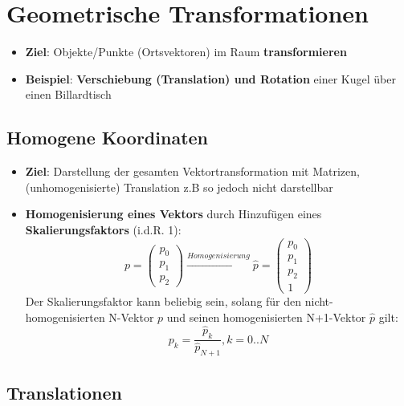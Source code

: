 \section{Geometrische Transformationen}%
\label{gtrans:sec:geometrische_transformationen}

\begin{itemize}
	\item \textbf{Ziel}: Objekte/Punkte (Ortsvektoren) im Raum \textbf{transformieren}
	\item \textbf{Beispiel}: \textbf{Verschiebung (Translation) und Rotation} einer Kugel über einen Billardtisch
\end{itemize}

\subsection{Homogene Koordinaten}%
\label{gtrans:sub:homogene_koordinaten}

\begin{itemize}
	\item \textbf{Ziel}: Darstellung der gesamten Vektortransformation mit Matrizen, (unhomogenisierte) Translation z.B so jedoch nicht darstellbar
	\item \textbf{Homogenisierung eines Vektors} durch Hinzufügen eines \textbf{Skalierungsfaktors} (i.d.R. 1):
	$$p = \begin{pmatrix} p_0 \\ p_1 \\ p_2 \end{pmatrix} \xrightarrow[]{Homogenisierung} \hat{p} = \begin{pmatrix} p_0 \\ p_1 \\ p_2 \\ 1 \end{pmatrix}$$
	Der Skalierungsfaktor kann beliebig sein, solang für den nicht-homogenisierten N-Vektor $p$ und seinen homogenisierten N+1-Vektor $\hat{p}$ gilt:
	$$p_k = \frac{\hat{p}_k}{\hat{p}_{N+1}}, k = 0..N$$
\end{itemize}

\subsection{Translationen}%
\label{gtrans:sub:translationen}

